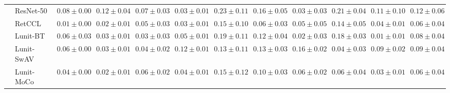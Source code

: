 \begin{tabular}{ll|cccc|c|cccc|c}
 & ResNet-50 & $0.08 \pm 0.00$ & $0.12 \pm 0.04$ & $0.07 \pm 0.03$ & $0.03 \pm 0.01$ & $0.23 \pm 0.11$ & $0.16 \pm 0.05$ & $0.03 \pm 0.03$ & $0.21 \pm 0.04$ & $0.11 \pm 0.10$ & $0.12 \pm 0.06$ \\
 & RetCCL & $0.01 \pm 0.00$ & $0.02 \pm 0.01$ & $0.05 \pm 0.03$ & $0.03 \pm 0.01$ & $0.15 \pm 0.10$ & $0.06 \pm 0.03$ & $0.05 \pm 0.05$ & $0.14 \pm 0.05$ & $0.04 \pm 0.01$ & $0.06 \pm 0.04$ \\
 & Lunit-BT & $0.06 \pm 0.03$ & $0.03 \pm 0.01$ & $0.03 \pm 0.03$ & $0.05 \pm 0.01$ & $0.19 \pm 0.11$ & $0.12 \pm 0.04$ & $0.02 \pm 0.03$ & $0.18 \pm 0.03$ & $\mathbf{0.01 \pm 0.01}$ & $0.08 \pm 0.04$ \\
 & Lunit-SwAV & $0.06 \pm 0.00$ & $0.03 \pm 0.01$ & $0.04 \pm 0.02$ & $0.12 \pm 0.01$ & $0.13 \pm 0.11$ & $0.13 \pm 0.03$ & $0.16 \pm 0.02$ & $0.04 \pm 0.03$ & $0.09 \pm 0.02$ & $0.09 \pm 0.04$ \\
 & Lunit-MoCo & $0.04 \pm 0.00$ & $0.02 \pm 0.01$ & $0.06 \pm 0.02$ & $0.04 \pm 0.01$ & $0.15 \pm 0.12$ & $0.10 \pm 0.03$ & $0.06 \pm 0.02$ & $0.06 \pm 0.04$ & $0.03 \pm 0.01$ & $0.06 \pm 0.04$ \\
\cline{1-12}
\bottomrule
\end{tabular}
